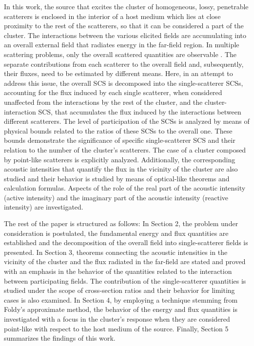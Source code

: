 \documentclass{article}
\begin{document}
In this work, the source that excites the cluster of homogeneous, lossy, penetrable scatterers is enclosed in the interior of a host medium which lies at close proximity to the rest of the scatterers, so that it can be considered a part of the cluster. The interactions between the various elicited fields are accumulating into an overall external field that radiates energy in the far-field region. In multiple scattering problems, only the overall scattered quantities are observable \cite{Martin}. The separate contributions from each scatterer to the overall field and, subsequently, their fluxes, need to be estimated by different means. Here, in an attempt to address this issue, the overall SCS is decomposed into the single-scatterer SCSs, accounting for the flux induced by each single scatterer, when considered unaffected from the interactions by the rest of the cluster, and the cluster-interaction SCS, that accumulates the flux induced by the interactions between different scatterers. The level of participation of the SCSs is analyzed by means of physical bounds related to the ratios of these SCSs to the overall one. These bounds demonstrate the significance of specific single-scatterer SCS and their relation to the number of the cluster's scatterers. The case of a cluster composed by point-like scatterers is explicitly analyzed. Additionally, the corresponding acoustic intensities that quantify the flux in the vicinity of the cluster are also studied and their behavior is studied by means of optical-like theorems and calculation formulas. Aspects of the role of the real part of the acoustic intensity (active intensity) and the imaginary part of the acoustic intensity (reactive intensity) are investigated.

The rest of the paper is structured as follows: In Section 2, the problem under consideration is postulated, the fundamental energy and flux quantities are established and the decomposition of the overall field into single-scatterer fields is presented. In Section 3, theorems connecting the acoustic intensities in the vicinity of the cluster and the flux radiated in the far-field are stated and proved with an emphasis in the behavior of the quantities related to the interaction between participating fields. The contribution of the single-scatterer quantities is studied under the scope of cross-section ratios and their behavior for limiting cases is also examined. In Section 4, by employing a technique stemming from Foldy's approximate method, the behavior of the energy and flux quantities is investigated with a focus in the cluster's response when they are considered point-like with respect to the host medium of the source. Finally, Section 5 summarizes the findings of this work.
\end{document}

